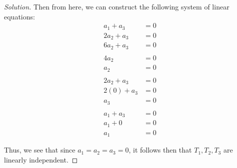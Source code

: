 \documentclass{article}
\newenvironment{solution}{\begin{proof}[Solution]}{\end{proof}}
\begin{document}
\begin{solution}
	Then from here, we can construct the following system of linear equations:
	\begin{align*}
		a_{1} + a_{3} &= 0 \\
		2a_{2} + a_{3} &= 0 \\
		6a_{2} + a_{3} &= 0 \\
		\\
		4a_{2} &= 0 \\
		a_{2} & = 0 \\
		\\
		2a_{2} + a_{3} &= 0 \\
		2(0) + a_{3} &= 0 \\
		a_{3} &= 0 \\
		\\
		a_{1} + a_{3} &= 0 \\
		a_{1} + 0 &= 0 \\
		a_{1} &= 0
	\end{align*}

	Thus, we see that since $a_{1} = a_{2} = a_{3} = 0$, it follows then that $T_{1}, T_{2}, T_{3}$ are linearly independent.
	\end{solution}

	\newpage
	
\end{document}
